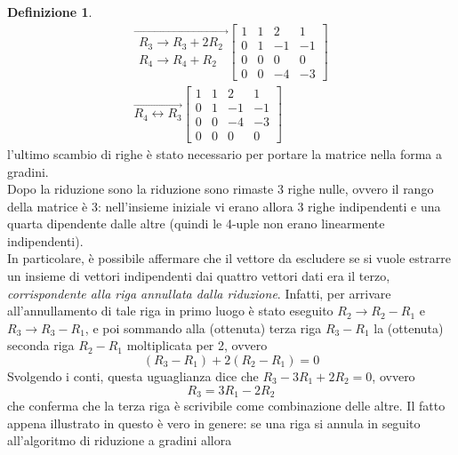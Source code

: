 \documentclass{book}
\theoremstyle{definition}
\newtheorem{defi}{Definizione}[section]
\theoremstyle{plain}
\begin{document}
\begin{defi}
\begin{equation}
\begin{matrix}
      \overrightarrow{
      \begin{matrix}
        R_3\to R_3+2R_2\\
        R_4\to R_4+R_2
      \end{matrix}
      }
      \begin{bmatrix}
        1 & 1 & 2 & 1\\
        0 & 1 & -1 & -1\\
        0 & 0 & 0 & 0\\
        0 & 0 & -4 & -3
      \end{bmatrix}\\
      \overrightarrow{
      R_4\leftrightarrow R_3}
      \begin{bmatrix}
        1 & 1 & 2 & 1\\
        0 & 1 & -1 & -1 \\
        0 & 0 & -4 & -3\\
        0 & 0 & 0 & 0
      \end{bmatrix}
    \end{matrix}
  \end{equation}
  l'ultimo scambio di righe è stato necessario per portare la matrice
  nella forma a gradini.\\
  Dopo la riduzione sono la riduzione sono rimaste 3 righe nulle, ovvero
  il rango della matrice è 3: nell'insieme iniziale vi erano allora 3
  righe indipendenti e una quarta dipendente dalle altre (quindi le
  4-uple non erano linearmente indipendenti).\\
  In particolare, è possibile affermare che il vettore da escludere se
  si vuole estrarre un insieme di vettori indipendenti dai quattro
  vettori dati era il terzo, \textit{corrispondente alla riga annullata
    dalla riduzione}. Infatti, per arrivare all'annullamento di tale riga
  in primo luogo è stato eseguito $R_2\to R_2-R_1$ e $R_3\to R_3-R_1$, e
  poi sommando alla (ottenuta) terza riga $R_3-R_1$ la (ottenuta) seconda
  riga $R_2-R_1$ moltiplicata per 2, ovvero
  \begin{equation*}
    (R_3-R_1)+2(R_2-R_1)=0
  \end{equation*}
  Svolgendo i conti, questa uguaglianza dice che $R_3-3R_1+2R_2=0$, ovvero
  \begin{equation*}
    R_3=3R_1-2R_2
  \end{equation*}
  che conferma che la terza riga è scrivibile come combinazione delle
  altre. Il fatto appena illustrato in questo è vero in genere: se una
  riga si annula in seguito all'algoritmo di riduzione a gradini allora

\end{defi}
\end{document}
